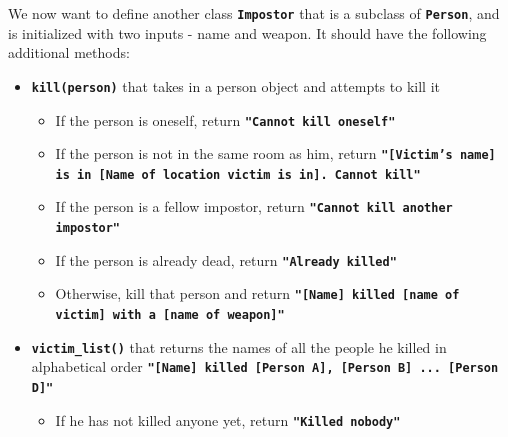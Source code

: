 We now want to define another class \texttt{\bfseries Impostor} that is a subclass of \texttt{\bfseries Person}, and is
initialized with two inputs - name and weapon. It should have the following additional methods:
\begin{itemize}
\item \texttt{\bfseries kill(person)} that takes in a person object and attempts to kill it
\begin{itemize}
\item If the person is oneself, return \texttt{\bfseries "Cannot kill oneself"}
\item If the person is not in the same room as him, return \texttt{\bfseries "[Victim's name] is
in [Name of location victim is in]. Cannot kill"}
\item If the person is a fellow impostor, return \texttt{\bfseries "Cannot kill another impostor"}
\item If the person is already dead, return \texttt{\bfseries "Already killed"}
\item Otherwise, kill that person and return \texttt{\bfseries "[Name] killed [name of victim] with a [name of weapon]"}
\end{itemize}
\item \texttt{\bfseries victim\_list()} that returns the names of all the people he killed in alphabetical
order \texttt{\bfseries "[Name] killed [Person A], [Person B] ... [Person D]"}
\begin{itemize}
\item If he has not killed anyone yet, return \texttt{\bfseries "Killed nobody"}
\end{itemize}
\end{itemize}

